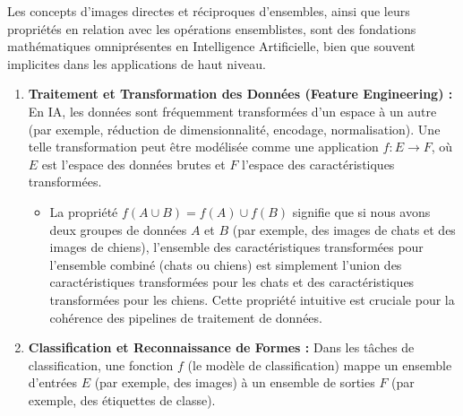 \documentclass[12pt,a4paper]{report}
\providecommand{\tightlist}{%
  \setlength{\itemsep}{0pt}\setlength{\parskip}{0pt}}
\begin{document}
Les concepts d'images directes et réciproques d'ensembles, ainsi que
leurs propriétés en relation avec les opérations ensemblistes, sont des
fondations mathématiques omniprésentes en Intelligence Artificielle,
bien que souvent implicites dans les applications de haut niveau.

\begin{enumerate}
\def\labelenumi{\arabic{enumi}.}
\item
  \textbf{Traitement et Transformation des Données (Feature Engineering)
  :} En IA, les données sont fréquemment transformées d'un espace à un
  autre (par exemple, réduction de dimensionnalité, encodage,
  normalisation). Une telle transformation peut être modélisée comme une
  application \(f: E \to F\), où \(E\) est l'espace des données brutes
  et \(F\) l'espace des caractéristiques transformées.

  \begin{itemize}
  \tightlist
  \item
    La propriété \(f(A \cup B) = f(A) \cup f(B)\) signifie que si nous
    avons deux groupes de données \(A\) et \(B\) (par exemple, des
    images de chats et des images de chiens), l'ensemble des
    caractéristiques transformées pour l'ensemble combiné (chats ou
    chiens) est simplement l'union des caractéristiques transformées
    pour les chats et des caractéristiques transformées pour les chiens.
    Cette propriété intuitive est cruciale pour la cohérence des
    pipelines de traitement de données.
  \end{itemize}
\item
  \textbf{Classification et Reconnaissance de Formes :} Dans les tâches
  de classification, une fonction \(f\) (le modèle de classification)
  mappe un ensemble d'entrées \(E\) (par exemple, des images) à un
  ensemble de sorties \(F\) (par exemple, des étiquettes de classe).


\end{enumerate}
\end{document}
